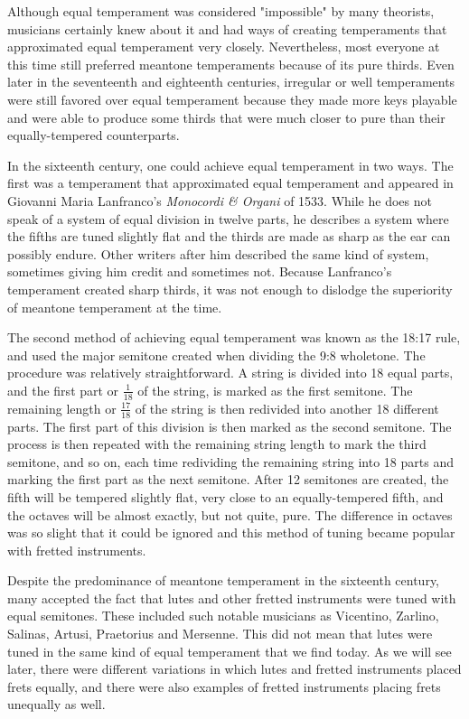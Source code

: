 Although equal temperament was considered "impossible" by many theorists, musicians
certainly knew about it and had ways of creating temperaments that approximated equal
temperament very closely.  Nevertheless, most everyone at this time still preferred
meantone temperaments because of its pure thirds.
Even later in the seventeenth and eighteenth centuries, irregular or well temperaments
were still favored over equal temperament because they made more keys playable and were able
to produce some thirds that were much closer to pure than their equally-tempered counterparts.

In the sixteenth century, one could achieve equal temperament in two ways.  The first
was a temperament that approximated equal temperament and
appeared in Giovanni Maria Lanfranco's \textit{Monocordi \& Organi} of 1533.
While he does not speak of a system of equal division in twelve parts, he
describes a system where the fifths are tuned slightly flat and the thirds
are made as sharp as the ear can possibly endure. \autocite[45]{MB:1}
Other writers after him described the same kind of system, sometimes
giving him credit and sometimes not.  Because Lanfranco's temperament created sharp thirds,
it was not enough to dislodge the superiority of meantone temperament at the time.

The second method of achieving equal temperament was known as the 18:17 rule, and used the
major semitone created when dividing the 9:8 wholetone.  The
procedure was relatively straightforward.  A string is divided into 18 equal parts, and the
first part or $ \frac{1}{18} $ of the string, is marked as
the first semitone.  The remaining length or $ \frac{17}{18} $ of the string is then redivided
into another 18 different parts.  The first part of this division is then marked as the
second semitone.  The process is then repeated with the remaining string length to mark the third
semitone, and so on, each time redividing the remaining string into 18 parts and marking the first
part as the next semitone.  After 12 semitones are created, the fifth will be tempered
slightly flat, very close to an equally-tempered fifth, and the octaves will be almost exactly,
but not quite, pure.  The difference in octaves was so slight that it could be ignored and this
method of tuning became popular with fretted instruments.

Despite the predominance of meantone temperament in the sixteenth
century, many accepted the
fact that lutes and other fretted instruments were tuned with
equal semitones.  These included such notable musicians as
Vicentino, Zarlino, Salinas, Artusi, Praetorius and Mersenne. \autocite[19]{ML:1}
This did not mean that lutes were tuned in the same kind of equal temperament that we
find today.
As we will see later, there were different variations in which
lutes and fretted instruments placed frets equally, and there
were also examples of fretted instruments placing frets
unequally as well.

